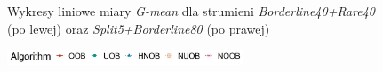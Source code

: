 \begin{figure}[h]
    \centering
    \qquad
    \caption{Wykresy liniowe miary \textit{G-mean} dla strumieni \textit{Borderline40+Rare40} (po lewej) oraz \textit{Split5+Borderline80} (po prawej)}
\end{figure}

\newpage

\begin{figure}[h]
    \centering
    \includegraphics[width=7cm]{figures/algorithms_legend_hnob.JPG}
\end{figure}

\vspace{-1.2cm}

